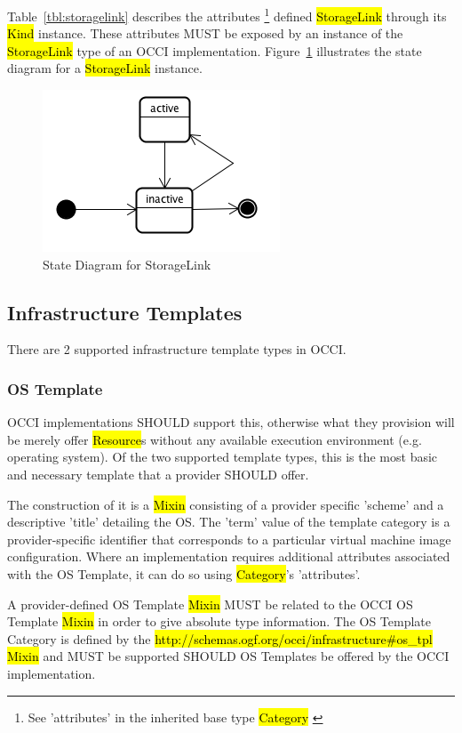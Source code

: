 \documentclass[10pt,a4paper]{article}
\begin{document}
Table~\ref{tbl:storagelink} describes the attributes \footnote{See ’attributes’ in the inherited 
base type \hl{Category}  \cite{occi:core}} 
defined \hl{StorageLink} through its \hl{Kind} instance. These attributes
MUST be exposed by an instance of the \hl{StorageLink} type of an OCCI implementation. 
Figure~\ref{fig:storagelink_state} illustrates the state diagram for a \hl{StorageLink} instance.

\begin{figure}[!h]
	\centering
	\includegraphics[scale=0.4]{figs/infra-link-state.png}
	\caption{State Diagram for StorageLink}
	\label{fig:storagelink_state}
\end{figure}

\subsection{Infrastructure Templates}
There are 2 supported infrastructure template types in OCCI.

\subsubsection{OS Template}
OCCI implementations SHOULD support this, otherwise what they provision will be merely offer \hl
{Resource}s without any available execution environment (e.g. operating system). Of the two 
supported template types, this is the most basic and necessary template that a provider SHOULD offer. 

The construction of it is a \hl{Mixin} consisting of a provider specific 'scheme' and a descriptive 'title' 
detailing the OS. The 'term' value of the template category is a provider-specific identifier that 
corresponds to a particular virtual machine image configuration. Where an implementation requires 
additional attributes associated with the OS Template, it can do so using \hl{Category}'s 'attributes'.

A provider-defined OS Template \hl{Mixin} MUST be related to 
the OCCI OS Template \hl{Mixin} in order to give absolute type information. The OS Template 
Category is defined by the \hl{http://schemas.ogf.org/occi/infrastructure\#os\_tpl} \hl{Mixin} and
MUST be supported SHOULD OS Templates be offered by the OCCI implementation.
\end{document}
